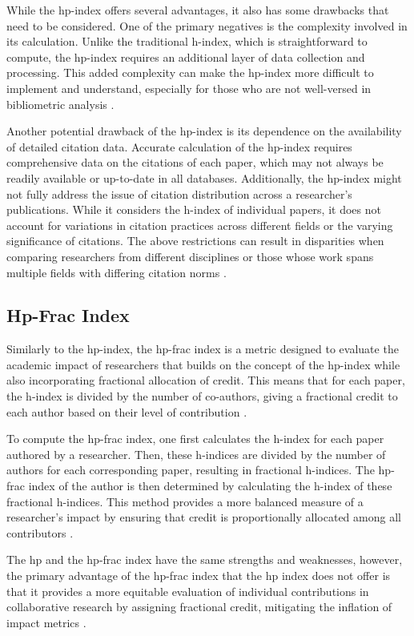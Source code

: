 While the hp-index offers several advantages, it also has some drawbacks that
need to be considered. One of the primary negatives is the complexity involved
in its calculation. Unlike the traditional h-index, which is straightforward to
compute, the hp-index requires an additional layer of data collection and
processing. This added complexity can make the hp-index more difficult to
implement and understand, especially for those who are not well-versed in
bibliometric analysis \cite{singhal2023hp}.

Another potential drawback of the hp-index is its dependence on the
availability of detailed citation data. Accurate calculation of the hp-index
requires comprehensive data on the citations of each paper, which may not
always be readily available or up-to-date in all databases. Additionally, the
hp-index might not fully address the issue of citation distribution across a
researcher's publications. While it considers the h-index of individual papers,
it does not account for variations in citation practices across different
fields or the varying significance of citations. The above restrictions can
result in disparities when comparing researchers from different disciplines or
those whose work spans multiple fields with differing citation norms
\cite{singhal2023hp,singhal2023analysis}.

\subsection{Hp-Frac Index}
Similarly to the hp-index, the hp-frac index is a metric designed to evaluate
the academic impact of researchers that builds on the concept of the hp-index
while also incorporating fractional allocation of credit. This means that for
each paper, the h-index is divided by the number of co-authors, giving a
fractional credit to each author based on their level of contribution
\cite{singhal2023hp}.

To compute the hp-frac index, one first calculates the h-index for each paper
authored by a researcher. Then, these h-indices are divided by the number of
authors for each corresponding paper, resulting in fractional h-indices. The
hp-frac index of the author is then determined by calculating the h-index of
these fractional h-indices. This method provides a more balanced measure of a
researcher's impact by ensuring that credit is proportionally allocated among
all contributors \cite{singhal2023hp}.

The hp and the hp-frac index have the same strengths and weaknesses, however,
the primary advantage of the hp-frac index that the hp index does not offer is
that it provides a more equitable evaluation of individual contributions in
collaborative research by assigning fractional credit, mitigating the inflation
of impact metrics \cite{singhal2023hp}.


